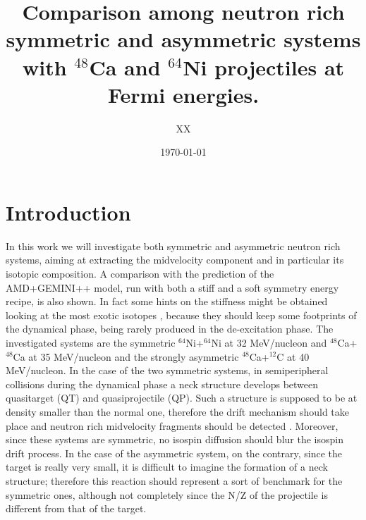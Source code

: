 \documentclass[twocolumn,showpacs,superscriptaddress,aps,prc,10pt,nofootinbib]{revtex4-1}
\begin{document}


\preprint{}

\title{Comparison among neutron rich symmetric and asymmetric systems with $^{48}$Ca and $^{64}$Ni projectiles at Fermi energies.}

 \author{XX}



\date{\today}%

\begin{abstract}

\end{abstract}

\pacs{}%
\maketitle


\section{Introduction}

In this work we will investigate both symmetric and asymmetric neutron rich systems, aiming at extracting the midvelocity component and in particular its isotopic composition. A comparison with the prediction of the AMD+GEMINI++ model, run with both a stiff and a soft symmetry energy recipe, is also shown. In fact some hints on the stiffness might be obtained looking at the most exotic isotopes \cite{Piantelli2021}, because they should keep some footprints of the dynamical phase, being rarely produced in the de-excitation phase.
The investigated systems are the symmetric $^{64}$Ni+$^{64}$Ni at 32 MeV/nucleon and $^{48}$Ca+$^{48}$Ca at 35 MeV/nucleon and the strongly asymmetric $^{48}$Ca+$^{12}$C at 40 MeV/nucleon. In the case of the two symmetric systems, in semiperipheral collisions during the dynamical phase a neck structure develops between quasitarget (QT) and quasiprojectile (QP). Such a structure is supposed to be at density smaller than the normal one, therefore the drift mechanism should take place and neutron rich midvelocity fragments should be detected \cite{Baranisospin}. Moreover, since these systems are symmetric, no isospin diffusion should blur the isospin drift process. In the case of the asymmetric system, on the contrary, since the target is really very small, it is difficult to imagine the formation of a neck structure; therefore this reaction should represent a sort of benchmark for the symmetric ones, although not completely since the N/Z of the projectile is different from that of the target.
\end{document}
